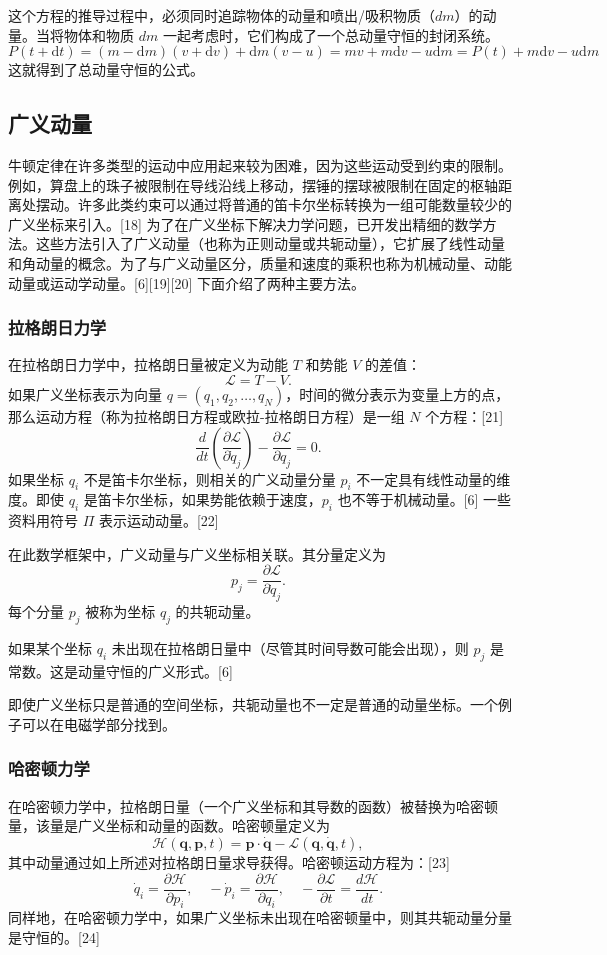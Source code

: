 这个方程的推导过程中，必须同时追踪物体的动量和喷出/吸积物质（\( dm \)）的动量。当将物体和物质 \( dm \) 一起考虑时，它们构成了一个总动量守恒的封闭系统。
\[
P(t + \text{d}t) = (m - \text{d}m)(v + \text{d}v) + \text{d}m(v - u) = mv + m\text{d}v - u\text{d}m = P(t) + m\text{d}v - u\text{d}m~
\]
这就得到了总动量守恒的公式。
\subsection{广义动量}
牛顿定律在许多类型的运动中应用起来较为困难，因为这些运动受到约束的限制。例如，算盘上的珠子被限制在导线沿线上移动，摆锤的摆球被限制在固定的枢轴距离处摆动。许多此类约束可以通过将普通的笛卡尔坐标转换为一组可能数量较少的广义坐标来引入。[18] 为了在广义坐标下解决力学问题，已开发出精细的数学方法。这些方法引入了广义动量（也称为正则动量或共轭动量），它扩展了线性动量和角动量的概念。为了与广义动量区分，质量和速度的乘积也称为机械动量、动能动量或运动学动量。[6][19][20] 下面介绍了两种主要方法。
\subsubsection{拉格朗日力学}
在拉格朗日力学中，拉格朗日量被定义为动能 \( T \) 和势能 \( V \) 的差值：
\[
\mathcal{L} = T - V.~
\]
如果广义坐标表示为向量 \( q = (q_1, q_2, \ldots, q_N) \)，时间的微分表示为变量上方的点，那么运动方程（称为拉格朗日方程或欧拉-拉格朗日方程）是一组 \( N \) 个方程：[21]
\[
\frac{d}{dt}\left(\frac{\partial \mathcal{L}}{\partial \dot{q}_j}\right) - \frac{\partial \mathcal{L}}{\partial q_j} = 0.~
\]
如果坐标 \( q_i \) 不是笛卡尔坐标，则相关的广义动量分量 \( p_i \) 不一定具有线性动量的维度。即使 \( q_i \) 是笛卡尔坐标，如果势能依赖于速度，\( p_i \) 也不等于机械动量。[6] 一些资料用符号 \( \Pi \) 表示运动动量。[22]

在此数学框架中，广义动量与广义坐标相关联。其分量定义为
\[
p_j = \frac{\partial \mathcal{L}}{\partial \dot{q}_j}.~
\]
每个分量 \( p_j \) 被称为坐标 \( q_j \) 的共轭动量。

如果某个坐标 \( q_i \) 未出现在拉格朗日量中（尽管其时间导数可能会出现），则 \( p_j \) 是常数。这是动量守恒的广义形式。[6]

即使广义坐标只是普通的空间坐标，共轭动量也不一定是普通的动量坐标。一个例子可以在电磁学部分找到。
\subsubsection{哈密顿力学}
在哈密顿力学中，拉格朗日量（一个广义坐标和其导数的函数）被替换为哈密顿量，该量是广义坐标和动量的函数。哈密顿量定义为
\[
\mathcal{H}(\mathbf{q}, \mathbf{p}, t) = \mathbf{p} \cdot \dot{\mathbf{q}} - \mathcal{L}(\mathbf{q}, \dot{\mathbf{q}}, t),~
\]
其中动量通过如上所述对拉格朗日量求导获得。哈密顿运动方程为：[23]
\[
\dot{q}_i = \frac{\partial \mathcal{H}}{\partial p_i}, \quad -\dot{p}_i = \frac{\partial \mathcal{H}}{\partial q_i}, \quad -\frac{\partial \mathcal{L}}{\partial t} = \frac{d\mathcal{H}}{dt}.~
\]
同样地，在哈密顿力学中，如果广义坐标未出现在哈密顿量中，则其共轭动量分量是守恒的。[24]

